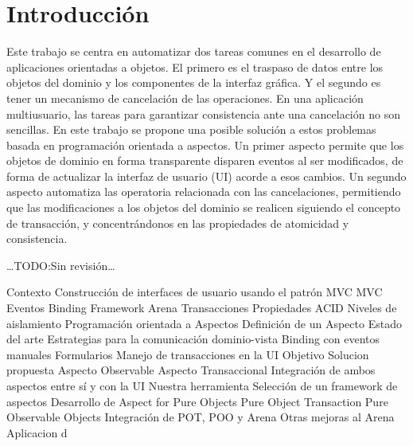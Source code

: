 \section{Introducción}

Este trabajo se centra en automatizar dos tareas comunes en el desarrollo
de aplicaciones orientadas a objetos. El primero es el traspaso de datos
entre los objetos del dominio y los componentes de la interfaz gráfica. Y el
segundo es tener un mecanismo de cancelación de las operaciones.
En una aplicación multiusuario, las tareas para garantizar consistencia ante una cancelación no
son sencillas. En este trabajo se propone una posible solución a estos
problemas basada en programación orientada a aspectos. Un primer aspecto
permite que los objetos de dominio en forma transparente disparen eventos al
ser modificados, de forma de actualizar la interfaz de usuario (UI) acorde a
esos cambios. Un segundo aspecto automatiza las operatoria relacionada con las
cancelaciones, permitiendo que las modificaciones a los objetos del dominio se
realicen siguiendo el concepto de transacción, y concentrándonos en las
propiedades de atomicidad y consistencia.



\ldots TODO:Sin revisión\ldots

Contexto
	Construcción de interfaces de usuario usando el patrón MVC
		MVC
		Eventos
		Binding
		Framework Arena
	Transacciones
		Propiedades ACID
		Niveles de aislamiento
	Programación orientada a Aspectos
		Definición de un Aspecto
Estado del arte
	Estrategias para la comunicación dominio-vista
		Binding con eventos manuales
		Formularios
	Manejo de transacciones en la UI
Objetivo
Solucion propuesta
	Aspecto Observable
 	Aspecto Transaccional
 	Integración de ambos aspectos entre sí y con la UI 
Nuestra herramienta
	Selección de un framework de aspectos
 	Desarrollo de Aspect for Pure Objects
 	Pure Object Transaction
 	Pure Observable Objects
 	Integración de POT, POO y Arena
  	Otras mejoras al Arena 
Aplicacion d 	